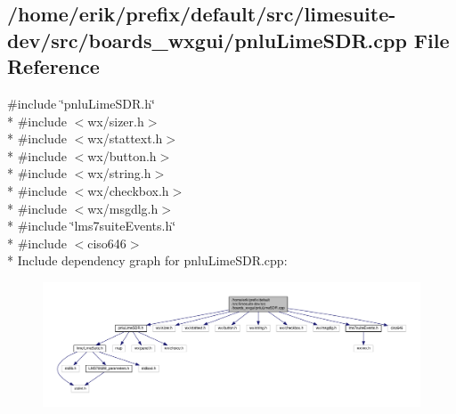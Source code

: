 \subsection{/home/erik/prefix/default/src/limesuite-\/dev/src/boards\+\_\+wxgui/pnlu\+Lime\+S\+DR.cpp File Reference}
\label{pnluLimeSDR_8cpp}
{\ttfamily \#include \char`\"{}pnlu\+Lime\+S\+D\+R.\+h\char`\"{}}\\*
{\ttfamily \#include $<$wx/sizer.\+h$>$}\\*
{\ttfamily \#include $<$wx/stattext.\+h$>$}\\*
{\ttfamily \#include $<$wx/button.\+h$>$}\\*
{\ttfamily \#include $<$wx/string.\+h$>$}\\*
{\ttfamily \#include $<$wx/checkbox.\+h$>$}\\*
{\ttfamily \#include $<$wx/msgdlg.\+h$>$}\\*
{\ttfamily \#include \char`\"{}lms7suite\+Events.\+h\char`\"{}}\\*
{\ttfamily \#include $<$ciso646$>$}\\*
Include dependency graph for pnlu\+Lime\+S\+D\+R.\+cpp\+:
\nopagebreak
\begin{figure}[H]
\begin{center}
\leavevmode
\includegraphics[width=350pt]{d5/d02/pnluLimeSDR_8cpp__incl}
\end{center}
\end{figure}
